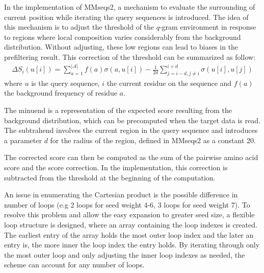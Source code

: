 In the implementation of MMseqs2, a mechanism to evaluate the surrounding of current position while iterating the query sequences is introduced. The idea of this mechanism is to adjust the threshold of the \(q\)-gram environment in response to regions where local composition varies considerably from the background distribution. Without adjusting, these low regions can lead to biases in the prefiltering result. This correction of the threshold can be summarized as follow:
\begin{align}
    \Delta S_i(u[i]) = \sum_{a=1}^{|\mathcal{A}|}f(a)\sigma(a,u[i])-\frac{1}{2d}\sum_{j=i-d,j\neq i}^{i+d}\sigma (u[i],u[j])
\end{align}
where \(u\) is the query sequence, \(i\) the current residue on the sequence and \(f(a)\) the background frequency of residue \(a\).

The minuend is a representation of the expected score resulting from the background distribution, which can be precomputed when the target data is read. The subtrahend involves the current region in the query sequence and introduces a parameter \(d\) for the radius of the region, defined in MMseqs2 as a constant 20.

The corrected score can then be computed as the sum of the pairwise amino acid score and the score correction. In the implementation, this correction is subtracted from the threshold at the beginning of the computation.

An issue in enumerating the Cartesian product is the possible difference in number of loops (e.g 2 loops for seed weight 4-6, 3 loops for seed weight 7). To resolve this problem and allow the easy expansion to greater seed size, a flexible loop structure is designed, where an array containing the loop indexes is created. The earliest entry of the array holds the most outer loop index and the later an entry is, the more inner the loop index the entry holds. By iterating through only the most outer loop and only adjusting the inner loop indexes as needed, the scheme can account for any number of loops.

